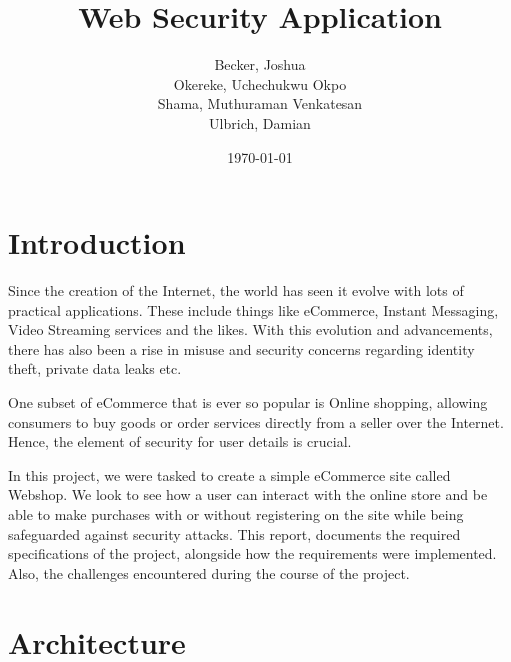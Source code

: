 \documentclass[12pt,a4paper]{article}
\begin{document}
	
	\title{Web Security Application}
	\author{Becker, Joshua\\ Okereke, Uchechukwu Okpo\\ Shama, Muthuraman Venkatesan\\ Ulbrich, Damian}
	\date{\today}
	\maketitle
	\thispagestyle{empty}
	\clearpage
	
	
	\tableofcontents
	\thispagestyle{empty}
	\clearpage
	\section{Introduction}
	
	
	\begin{flushleft}
	Since the creation of the Internet, the world has seen it evolve with lots of practical applications. These include things like eCommerce, Instant Messaging, Video Streaming services and the likes. With this evolution and advancements, there has also been a rise in misuse and security concerns regarding identity theft, private data leaks etc.
	
		
	One subset of eCommerce that is ever so popular is Online shopping, allowing consumers to buy goods or order services directly from a seller over the Internet. Hence, the element of security for user details is crucial.
	
	
	In this project, we were tasked to create a simple eCommerce site called Webshop. We look to see how a user can interact with the online store and be able to make purchases with or without registering on the site while being safeguarded against security attacks. This report, documents the required specifications of the project, alongside how the requirements were implemented. Also, the challenges encountered during the course of the project.
	
		
	\section{Architecture}
	

\end{flushleft}
\end{document}
